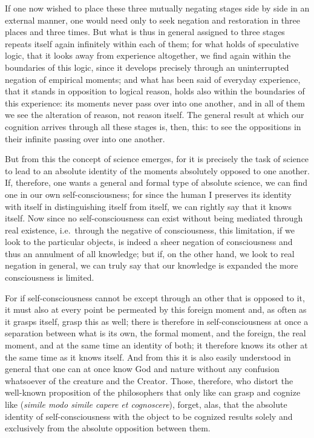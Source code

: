 \documentclass[12pt]{book}
\newcommand{\opage}[1]{\marginnote{\footnotesize\textit{[#1]}}}
\begin{document}
If one now wished to place these three mutually negating stages side by side in
an external manner, one would need only to seek negation and restoration in
three places and three times. But what is thus in general assigned to three
stages repeats itself again infinitely within each of them; for what holds of
speculative logic, that it looks away from experience altogether, we find again
within the boundaries of this logic, since it develops precisely through an
uninterrupted negation of empirical moments; and what has been said of everyday
experience, that it stands in opposition to logical reason, holds also within
the boundaries of this experience: its moments never pass over into one another,
and in all of them we see the alteration of reason, not reason itself. The
general result at which our cognition arrives through all these stages is, then,
this: to see the oppositions in their infinite passing over into one another.

But from this the concept of science emerges, for it is precisely the task of
science to lead to an absolute identity of the moments absolutely opposed to one
another. If, therefore, one wants a general and formal type of absolute science,
we can find one in our own self-consciousness; for since the human I preserves
its identity with itself in distinguishing itself from itself, we can rightly
say that it knows itself. Now since no self-consciousness can exist without being
mediated through real existence, i.e.\ through the negative of consciousness,
this limitation, if we
\opage{32} look to the particular objects, is indeed a sheer negation of consciousness
and thus an annulment of all knowledge; but if, on the other hand, we look to
real negation in general, we can truly say that our knowledge is expanded the
more consciousness is limited.

For if self-consciousness cannot be except through an other that is opposed to
it, it must also at every point be permeated by this foreign moment and, as often
as it grasps itself, grasp this as well; there is therefore in self-consciousness
at once a separation between what is its own, the formal moment, and the
foreign, the real moment, and at the same time an identity of both; it therefore
knows its other at the same time as it knows itself. And from this it is also
easily understood in general that one can at once know God and nature without
any confusion whatsoever of the creature and the Creator. Those, therefore, who
distort the well-known proposition of the philosophers that only like can grasp
and cognize like (\textit{simile modo simile capere et cognoscere}), forget,
alas, that the absolute identity of self-consciousness with the object to be
cognized results solely and exclusively from the absolute opposition between
them.
\end{document}
